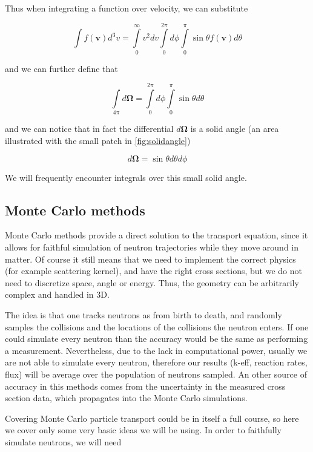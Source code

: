Thus when integrating a function over velocity, we can substitute

\begin{equation}
\int f(\mathbf{v})d^3v=\int\limits_0^\infty v^2 dv\int\limits_0^{2\pi}d\phi\int\limits_0^\pi \sin\theta f(\mathbf{v})d\theta
\end{equation}

\noindent and we can further define that 

\begin{equation}
\int\limits_{4\pi}d\mathbf{\Omega}=\int\limits_0^{2\pi}d\phi\int\limits_0^\pi \sin\theta d\theta
\end{equation}

\noindent and we can notice that in fact the differential $d\mathbf{\Omega}$ is a solid angle (an area illustrated with the small patch in \autoref{fig:solidangle})

\[
d\mathbf{\Omega}=\sin\theta d\theta d\phi
\]

We will frequently encounter integrals over this small solid angle.


\subsection{Monte Carlo methods}

Monte Carlo methods provide a direct solution to the transport equation, since it allows for faithful simulation of neutron trajectories while they move around in matter. Of course it still means that we need to implement the correct physics (for example scattering kernel), and have the right cross sections, but we do not need to discretize space, angle or energy. Thus, the geometry can be arbitrarily complex and handled in 3D.

The idea is that one tracks neutrons as from birth to death, and randomly samples the collisions and the locations of the collisions the neutron enters. If one could simulate every neutron than the accuracy would be the same as performing a measurement. Nevertheless, due to the lack in computational power, usually we are not able to simulate every neutron, therefore our results (k-eff,  reaction rates, flux) will be average over the population of neutrons sampled. An other source of accuracy in this methods comes from the uncertainty in the measured cross section data, which propagates into the Monte Carlo simulations.

Covering Monte Carlo particle transport could be in itself a full course, so here we cover only some very basic ideas we will be using. In order to faithfully simulate neutrons, we will need

